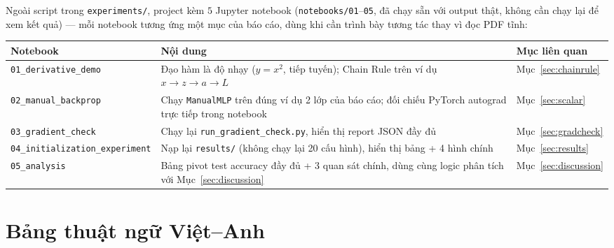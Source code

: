 \documentclass[12pt,a4paper]{article}
\begin{document}
Ngoài script trong \texttt{experiments/}, project kèm $5$ Jupyter notebook
(\texttt{notebooks/01}--\texttt{05}, đã chạy sẵn với output thật, không
cần chạy lại để xem kết quả) --- mỗi notebook tương ứng một mục của báo
cáo, dùng khi cần trình bày tương tác thay vì đọc PDF tĩnh:

\begin{table}[H]
\centering
\small
\begin{tabular}{@{}p{2.5cm}p{8.8cm}p{2.4cm}@{}}
\toprule
\textbf{Notebook} & \textbf{Nội dung} & \textbf{Mục liên quan} \\
\midrule
\texttt{01\_\allowbreak derivative\_\allowbreak demo} & Đạo hàm là độ nhạy ($y=x^2$, tiếp tuyến); Chain Rule trên ví dụ $x\to z\to a\to L$ & Mục~\ref{sec:chainrule} \\
\texttt{02\_\allowbreak manual\_\allowbreak backprop} & Chạy \texttt{ManualMLP} trên đúng ví dụ 2 lớp của báo cáo; đối chiếu PyTorch autograd trực tiếp trong notebook & Mục~\ref{sec:scalar} \\
\texttt{03\_\allowbreak gradient\_\allowbreak check} & Chạy lại \texttt{run\_gradient\_check.py}, hiển thị report JSON đầy đủ & Mục~\ref{sec:gradcheck} \\
\texttt{04\_\allowbreak initialization\_\allowbreak experiment} & Nạp lại \texttt{results/} (không chạy lại 20 cấu hình), hiển thị bảng + 4 hình chính & Mục~\ref{sec:results} \\
\texttt{05\_\allowbreak analysis} & Bảng pivot test accuracy đầy đủ + 3 quan sát chính, dùng cùng logic phân tích với Mục~\ref{sec:discussion} & Mục~\ref{sec:discussion} \\
\bottomrule
\end{tabular}
\label{tab:notebooks}
\end{table}

\section{Bảng thuật ngữ Việt--Anh}
\label{app:glossary}
\end{document}
